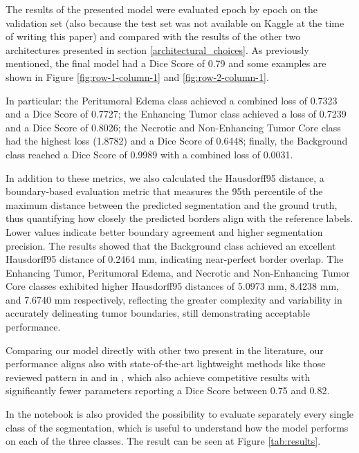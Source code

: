 \documentclass[10pt,twocolumn,letterpaper]{article}
\begin{document}
The results of the presented model were evaluated epoch by epoch on the validation set (also because the test set was not available on Kaggle at the time of writing this paper) and compared with the results of the other two architectures presented in section \ref{architectural_choices}.
As previously mentioned, the final model had a Dice Score of 0.79 and some examples are shown in Figure \ref{fig:row-1-column-1} and \ref{fig:row-2-column-1}.

In particular: the Peritumoral Edema class achieved a combined loss of 0.7323 and a Dice Score of 0.7727; the Enhancing Tumor class achieved a loss of 0.7239 and a Dice Score of 0.8026; the Necrotic and Non-Enhancing Tumor Core class had the highest loss (1.8782) and a Dice Score of 0.6448; finally, the Background class reached a Dice Score of 0.9989 with a combined loss of 0.0031.

In addition to these metrics, we also calculated the Hausdorff95 distance, a boundary-based evaluation metric that measures the 95th percentile of the maximum distance between the predicted segmentation and the ground truth, thus quantifying how closely the predicted borders align with the reference labels. Lower values indicate better boundary agreement and higher segmentation precision. The results showed that the Background class achieved an excellent Hausdorff95 distance of 0.2464 mm, indicating near-perfect border overlap. The Enhancing Tumor, Peritumoral Edema, and Necrotic and Non-Enhancing Tumor Core classes exhibited higher Hausdorff95 distances of 5.0973 mm, 8.4238 mm, and 7.6740 mm respectively, reflecting the greater complexity and variability in accurately delineating tumor boundaries, still demonstrating acceptable performance.

Comparing our model directly with other two present in the literature, our performance aligns also with state-of-the-art lightweight methods like those reviewed pattern in \cite{An2024DWKD} and in \cite{Gutierrez2024Brain}, which also achieve competitive results with significantly fewer parameters reporting a Dice Score between 0.75 and 0.82.

In the notebook is also provided the possibility to evaluate separately every single class of the segmentation, which is useful to understand how the model performs on each of the three classes. The result can be seen at Figure \ref{tab:results}.
\end{document}
